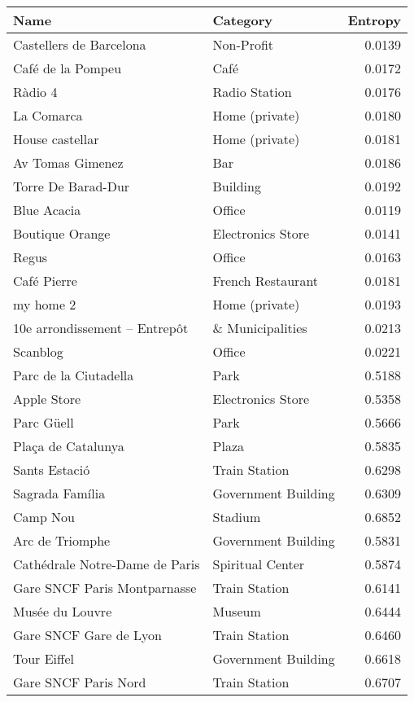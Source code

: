 \begin{tabular}{llr}
	\toprule
	Name                    & Category            & Entropy \\
	\midrule
    Castellers de Barcelona       & Non-Profit        & 0.0139 \\
    Café de la Pompeu             & Café              & 0.0172 \\
    Ràdio 4                       & Radio Station     & 0.0176 \\
    La Comarca                    & Home (private)    & 0.0180 \\
    House castellar               & Home (private)    & 0.0181 \\
    Av Tomas Gimenez              & Bar               & 0.0186 \\
    Torre De Barad-Dur            & Building          & 0.0192 \\
    \midrule
    Blue Acacia                   & Office            & 0.0119 \\
    Boutique Orange               & Electronics Store & 0.0141 \\
    Regus                         & Office            & 0.0163 \\
    Café Pierre                   & French Restaurant & 0.0181 \\
    my home 2                     & Home (private)    & 0.0193 \\
    10e arrondissement – Entrepôt & \& Municipalities & 0.0213 \\
    Scanblog                      & Office            & 0.0221 \\
	\midrule
    Parc de la Ciutadella          & Park                & 0.5188 \\
    Apple Store                    & Electronics Store   & 0.5358 \\
    Parc Güell                     & Park                & 0.5666 \\
    Plaça de Catalunya             & Plaza               & 0.5835 \\
    Sants Estació                  & Train Station       & 0.6298 \\
    Sagrada Família                & Government Building & 0.6309 \\
    Camp Nou                       & Stadium             & 0.6852 \\
    \midrule
    Arc de Triomphe                & Government Building & 0.5831 \\
    Cathédrale Notre-Dame de Paris & Spiritual Center    & 0.5874 \\
    Gare SNCF Paris Montparnasse   & Train Station       & 0.6141 \\
    Musée du Louvre                & Museum              & 0.6444 \\
    Gare SNCF Gare de Lyon         & Train Station       & 0.6460 \\
    Tour Eiffel                    & Government Building & 0.6618 \\
    Gare SNCF Paris Nord           & Train Station       & 0.6707 \\
	\bottomrule
\end{tabular}

